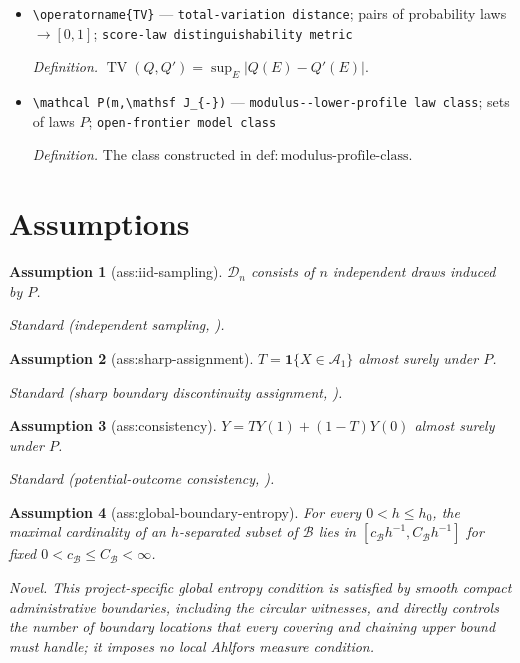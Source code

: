 \documentclass{article}
\newtheorem{assumption}{Assumption}
\begin{document}
\begin{itemize}
  \item \texttt{\textbackslash{}\allowbreak{}operatorname\{TV\}\allowbreak{}} --- \texttt{total-\allowbreak{}variation distance}; pairs of probability laws \(\to[0,1]\); \texttt{score-\allowbreak{}law distinguishability metric}
  \par\smallskip\noindent\emph{Definition.} \(\operatorname{TV}(Q,Q')=\sup_E|Q(E)-Q'(E)|\).
  \item \texttt{\textbackslash{}\allowbreak{}mathcal P(m,\allowbreak{}\textbackslash{}\allowbreak{}mathsf J\_\allowbreak{}\{-\allowbreak{}\}\allowbreak{})} --- \texttt{modulus-\allowbreak{}-\allowbreak{}lower-\allowbreak{}profile law class}; sets of laws \(P\); \texttt{open-\allowbreak{}frontier model class}
  \par\smallskip\noindent\emph{Definition.} The class constructed in \(\mathrm{def:modulus\text{-}profile\text{-}class}\).
\end{itemize}

\section{Assumptions}

\begin{assumption}[ass:iid-sampling]\label{ass:iid-sampling}
\(\mathcal D_n\) consists of \(n\) independent draws induced by \(P\).
\par\smallskip\noindent\emph{Standard} (independent sampling, \cite{CattaneoTitiunikYu2026Distance}).
\end{assumption}

\begin{assumption}[ass:sharp-assignment]\label{ass:sharp-assignment}
\(T=\mathbf 1\{X\in\mathcal A_1\}\) almost surely under \(P\).
\par\smallskip\noindent\emph{Standard} (sharp boundary discontinuity assignment, \cite{CattaneoTitiunikYu2026Distance}).
\end{assumption}

\begin{assumption}[ass:consistency]\label{ass:consistency}
\(Y=T Y(1)+(1-T)Y(0)\) almost surely under \(P\).
\par\smallskip\noindent\emph{Standard} (potential-outcome consistency, \cite{HahnToddVanDerKlaauw2001}).
\end{assumption}

\begin{assumption}[ass:global-boundary-entropy]\label{ass:global-boundary-entropy}
For every \(0<h\le h_0\), the maximal cardinality of an \(h\)-separated subset of \(\mathcal B\) lies in \([c_{\mathcal B}h^{-1},C_{\mathcal B}h^{-1}]\) for fixed \(0<c_{\mathcal B}\le C_{\mathcal B}<\infty\).
\par\smallskip\noindent\emph{Novel.} This project-specific global entropy condition is satisfied by smooth compact administrative boundaries, including the circular witnesses, and directly controls the number of boundary locations that every covering and chaining upper bound must handle; it imposes no local Ahlfors measure condition.
\end{assumption}
\end{document}
